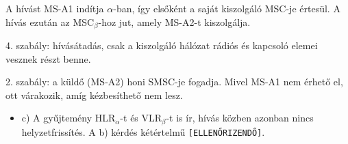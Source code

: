 A hívást MS-A1 indítja $\alpha$-ban, így elsőként a saját kiszolgáló MSC-je értesül. A hívás ezután az MSC$_\beta$-hoz jut, amely MS-A2-t kiszolgálja.

\begin{center}\end{center}

4. szabály: hívásátadás, csak a kiszolgáló hálózat rádiós és kapcsoló elemei vesznek részt benne.

\begin{center}\end{center}

2. szabály: a küldő (MS-A2) honi SMSC-je fogadja. Mivel MS-A1 nem érhető el, ott várakozik, amíg kézbesíthető nem lesz.

\begin{center}\end{center}
\begin{eredmeny}

\begin{center}\end{center}
\end{eredmeny}
\begin{tipp}[Ellenőrzés]
\begin{itemize}
\item c) A gyűjtemény HLR$_\alpha$-t és VLR$_\beta$-t is ír, hívás közben azonban nincs helyzetfrissítés. A b) kérdés kétértelmű \texttt{[ELLENŐRIZENDŐ]}.
\end{itemize}
\end{tipp}



